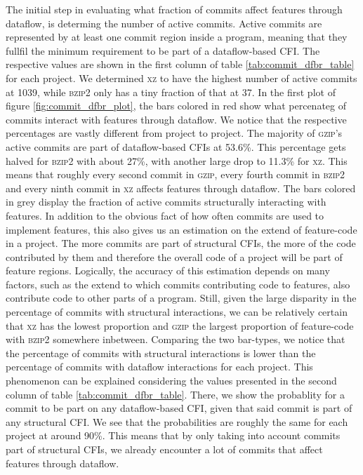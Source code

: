 The initial step in evaluating what fraction of commits affect features through dataflow, is determing the number of active commits.
Active commits are represented by at least one commit region inside a program, meaning that they fullfil the minimum requirement to be part of a dataflow-based CFI.
The respective values are shown in the first column of table \ref{tab:commit_dfbr_table} for each project.
We determined \textsc{xz} to have the highest number of active commits at 1039, while \textsc{bzip2} only has a tiny fraction of that at 37.
In the first plot of figure \ref{fig:commit_dfbr_plot}, the bars colored in red show what percenateg of commits interact with features through dataflow.
We notice that the respective percentages are vastly different from project to project.
The majority of \textsc{gzip}'s active commits are part of dataflow-based CFIs at 53.6\%.
This percentage gets halved for \textsc{bzip2} with about 27\%, with another large drop to 11.3\% for \textsc{xz}.
This means that roughly every second commit in \textsc{gzip}, every fourth commit in \textsc{bzip2} and every ninth commit in \textsc{xz} affects features through dataflow.
The bars colored in grey display the fraction of active commits structurally interacting with features.
In addition to the obvious fact of how often commits are used to implement features, this also gives us an estimation on the extend of feature-code in a project.
The more commits are part of structural CFIs, the more of the code contributed by them and therefore the overall code of a project will be part of feature regions.
Logically, the accuracy of this estimation depends on many factors, such as the extend to which commits contributing code to features, also contribute code to other parts of a program.
Still, given the large disparity in the percentage of commits with structural interactions, we can be relatively certain that \textsc{xz} has the lowest proportion and \textsc{gzip} the largest proportion of feature-code with \textsc{bzip2} somewhere inbetween.
Comparing the two bar-types, we notice that the percentage of commits with structural interactions is lower than the percentage of commits with dataflow interactions for each project.
This phenomenon can be explained considering the values presented in the second column of table \ref{tab:commit_dfbr_table}.
There, we show the probablity for a commit to be part on any dataflow-based CFI, given that said commit is part of any structural CFI.
We see that the probabilities are roughly the same for each project at around 90\%.
This means that by only taking into account commits part of structural CFIs, we already encounter a lot of commits that affect features through dataflow.
